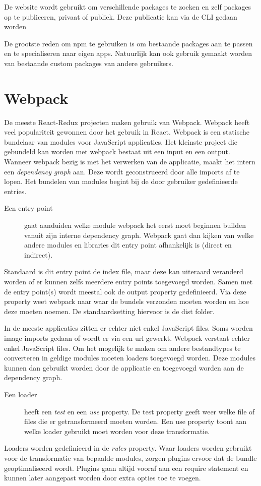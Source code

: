 De website wordt gebruikt om verschillende packages te zoeken en zelf packages op te publiceren, privaat of publiek. Deze publicatie kan via de CLI gedaan worden

De grootste reden om npm te gebruiken is om bestaande packages aan te passen en te specialiseren naar eigen apps. Natuurlijk kan ook gebruik gemaakt worden van bestaande custom packages van andere gebruikers.
\autocite{npm}

\section{Webpack}
De meeste React-Redux projecten maken gebruik van Webpack. Webpack heeft veel populariteit gewonnen door het gebruik in React. Webpack is een statische bundelaar van modules voor JavaScript applicaties. Het kleinste project die gebundeld kan worden met webpack bestaat uit een input en een output. Wanneer webpack bezig is met het verwerken van de applicatie, maakt het intern een \textit{dependency graph} aan. Deze wordt geconstrueerd door alle imports af te lopen. Het bundelen van modules begint bij de door gebruiker gedefinieerde entries.
\begin{description}
	\item[Een entry point] 
	 gaat aanduiden welke module webpack het eerst moet beginnen builden vanuit zijn interne dependency graph. Webpack gaat dan kijken van welke andere modules en libraries dit entry point afhankelijk is (direct en indirect). 
\end{description}

Standaard is dit entry point de index file, maar deze kan uiteraard veranderd worden of er kunnen zelfs meerdere entry points toegevoegd worden. Samen met de entry point(s) wordt meestal ook de output property gedefinieerd. Via deze property weet webpack naar waar de bundels verzonden moeten worden en hoe deze moeten noemen. De standaardsetting hiervoor is de dist folder.

In de meeste applicaties zitten er echter niet enkel JavaScript files. Soms worden image imports gedaan of wordt er via een url gewerkt. Webpack verstaat echter enkel JavaScript files. Om het mogelijk te maken om andere bestandtypes te converteren in geldige modules moeten loaders toegevoegd worden. Deze modules kunnen dan gebruikt worden door de applicatie en toegevoegd worden aan de dependency graph. 

\begin{description}
	\item[Een loader] heeft een \textit{test} en een \textit{use} property. De test property geeft weer welke file of files die er getransformeerd moeten worden. Een use property toont aan welke loader gebruikt moet worden voor deze transformatie.
\end{description}

Loaders worden gedefinieerd in de \textit{rules} property.
Waar loaders worden gebruikt voor de transformatie van bepaalde modules, zorgen plugins ervoor dat de bundle geoptimaliseerd wordt. Plugins gaan altijd vooraf aan een require statement en kunnen later aangepast worden door extra opties toe te voegen. 

